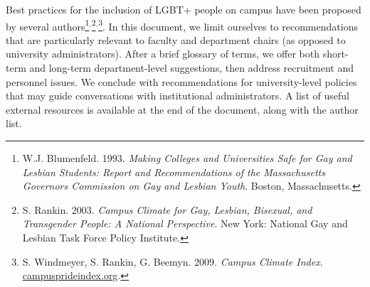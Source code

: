 \begin{titlepage}
Best practices for the inclusion of LGBT+ people on campus have been proposed by several authors\footnote{W.J. Blumenfeld. 1993. \emph{Making Colleges and Universities Safe for Gay and Lesbian Students: Report and Recommendations of the Massachusetts Governors Commission on Gay and Lesbian Youth}. Boston, Massachusetts.}$^,$\footnote{S. Rankin. 2003. \emph{Campus Climate for Gay, Lesbian, Bisexual, and Transgender People: A National Perspective}. New York: National Gay and Lesbian Task Force Policy Institute.}$^,$\footnote{S. Windmeyer, S. Rankin, G. Beemyn. 2009. \emph{Campus Climate Index}. \href{http://www.campusprideindex.org}{campusprideindex.org}.}. In this document, we limit ourselves to recommendations that are particularly relevant to faculty and department chairs (as opposed to university administrators). After a brief glossary of terms, we offer both short-term and long-term department-level suggestions, then address recruitment and personnel issues.  We conclude with recommendations for university-level policies that may guide conversations with institutional administrators. A list of useful external resources is available at the end of the document, along with the author list.\vspace*{\baselineskip}

\end{titlepage}